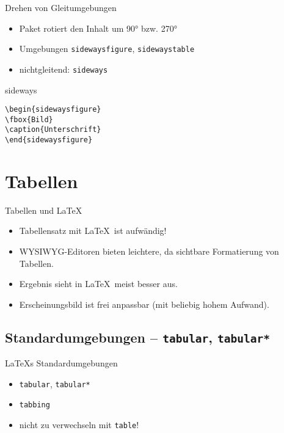 \documentclass[
	vorläufig=false,
	datum=2016-11-11,
	titel={Gleitumgebungen und Tabellen},
	web=false,
	noshortverb=true,
]{../tex/latexkurs-slides}
\begin{document}
\begin{frame}[fragile]{Drehen von Gleitumgebungen}
\begin{itemize}
\item Paket  rotiert den Inhalt um 90° bzw. 270°
\item Umgebungen \verb/sidewaysfigure/, \verb/sidewaystable/
\item nichtgleitend: \verb/sideways/
\end{itemize}
\begin{LTXexample}[width=.4\textwidth]
\centering
\begin{sideways}
[Bild]
\end{sideways}
\end{LTXexample}
\end{frame}

\begin{frame}[fragile]{sideways}
\begin{lstlisting}
\begin{sidewaysfigure}
\fbox{Bild}
\caption{Unterschrift}
\end{sidewaysfigure}
\end{lstlisting}
\end{frame}

\section{Tabellen}
\begin{frame}{Tabellen und \LaTeX}
\begin{itemize}
\item[$\pmb-$] Tabellensatz mit \LaTeX\ ist aufwändig!
\item[$\pmb-$] WYSIWYG-Editoren bieten leichtere, da sichtbare Formatierung von Tabellen.
\item[$\pmb+$] Ergebnis sieht in \LaTeX\ meist besser aus.
\item[$\pmb+$] Erscheinungsbild ist frei anpassbar (mit beliebig hohem Aufwand).
\end{itemize}
\end{frame}

\subsection[tabular]{Standardumgebungen – \texttt{tabular}, \texttt{tabular*}}
\begin{frame}[fragile]{\LaTeX{}s Standardumgebungen}
\begin{itemize}
\item \verb/tabular/, \verb/tabular*/
\item \verb/tabbing/
\item \alert{nicht zu verwechseln mit \texttt{table}!}
\end{itemize}
\end{frame}
\end{document}

